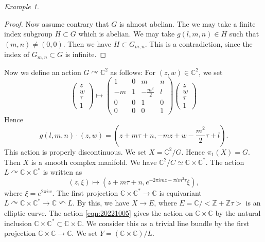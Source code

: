 \documentclass[11pt,english]{smfart}
\theoremstyle{plain}
\theoremstyle{definition}
\theoremstyle{remark}
\newtheorem{example}[thm]{Example}
\numberwithin{equation}{subsection}
\theoremstyle{plain}
\begin{document}
\begin{example}
\begin{proof}
		
		
		Now assume contrary that $G$ is almost abelian.
		The we may take a finite index subgroup $H\subset G$ which is abelian.
		We may take $g(l,m,n)\in H$ such that $(m,n)\not=(0,0)$.
		Then we have $H\subset G_{m,n}$.
		This is a contradiction, since the index of $G_{m,n}\subset G$ is infinite.
	\end{proof}
	
	
	
	
	
	
	Now we define an action $G\curvearrowright \mathbb C^2$ as follows:
	For $(z,w)\in\mathbb C^2$, we set
	$$
	\begin{pmatrix}
		z  \\
		w\\
		\tau \\
		1 
	\end{pmatrix}
	\mapsto
	\begin{pmatrix}
		1 & 0 & m & n \\
		-m & 1 & -\frac{m^2}{2} & l \\
		0 & 0 & 1 & 0 \\
		0 & 0 & 0 & 1\end{pmatrix}
	\begin{pmatrix}
		z  \\
		w\\
		\tau  \\
		1 
	\end{pmatrix}
	$$
	Hence
	$$
	g(l,m,n)\cdot (z,w)=\left(z+m\tau+n,-mz+w-\frac{m^2}{2}\tau+l\right).
	$$
	This action is properly discontinuous.
	We set $X=\mathbb C^2/G$.
	Hence 
	$\pi_1(X)=G.$ 
	Then $X$ is a smooth complex manifold.
	We have $\mathbb C^2/C\simeq \mathbb C\times \mathbb C^*$.
	The action $L\curvearrowright \mathbb C\times \mathbb C^*$ is written as 
	\begin{equation}\label{eqn:20221005}
		(z,\xi)\mapsto (z+m\tau+n,e^{-2\pi i mz-\pi im^2\tau}\xi),
	\end{equation}
	where $\xi=e^{2\pi iw}$.
	The first projection $\mathbb C\times \mathbb C^*\to \mathbb C$ is equivariant $L\curvearrowright \mathbb C\times \mathbb C^*\to \mathbb C\curvearrowleft L$.
	By this, we have $X\to E$, where $E=\mathbb C/<\mathbb Z+\mathbb Z\tau>$ is an elliptic curve.
	The action \eqref{eqn:20221005} gives the action on $\mathbb C\times \mathbb C$ by the natural inclusion $\mathbb C\times \mathbb C^*\subset \mathbb C\times \mathbb C$.
	We consider this as a trivial line bundle by the first projection $\mathbb C\times \mathbb C\to \mathbb C$. 
	We set $Y=(\mathbb C\times \mathbb C)/L$.

\end{example}
\end{document}
